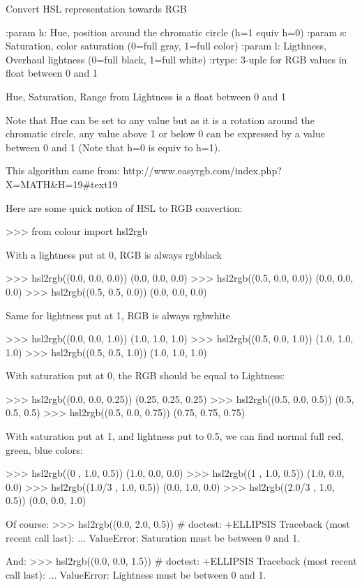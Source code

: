 \begin{DoxyVerb}Convert HSL representation towards RGB

:param h: Hue, position around the chromatic circle (h=1 equiv h=0)
:param s: Saturation, color saturation (0=full gray, 1=full color)
:param l: Ligthness, Overhaul lightness (0=full black, 1=full white)
:rtype: 3-uple for RGB values in float between 0 and 1

Hue, Saturation, Range from Lightness is a float between 0 and 1

Note that Hue can be set to any value but as it is a rotation
around the chromatic circle, any value above 1 or below 0 can
be expressed by a value between 0 and 1 (Note that h=0 is equiv
to h=1).

This algorithm came from:
http://www.easyrgb.com/index.php?X=MATH&H=19#text19

Here are some quick notion of HSL to RGB convertion:

>>> from colour import hsl2rgb

With a lightness put at 0, RGB is always rgbblack

>>> hsl2rgb((0.0, 0.0, 0.0))
(0.0, 0.0, 0.0)
>>> hsl2rgb((0.5, 0.0, 0.0))
(0.0, 0.0, 0.0)
>>> hsl2rgb((0.5, 0.5, 0.0))
(0.0, 0.0, 0.0)

Same for lightness put at 1, RGB is always rgbwhite

>>> hsl2rgb((0.0, 0.0, 1.0))
(1.0, 1.0, 1.0)
>>> hsl2rgb((0.5, 0.0, 1.0))
(1.0, 1.0, 1.0)
>>> hsl2rgb((0.5, 0.5, 1.0))
(1.0, 1.0, 1.0)

With saturation put at 0, the RGB should be equal to Lightness:

>>> hsl2rgb((0.0, 0.0, 0.25))
(0.25, 0.25, 0.25)
>>> hsl2rgb((0.5, 0.0, 0.5))
(0.5, 0.5, 0.5)
>>> hsl2rgb((0.5, 0.0, 0.75))
(0.75, 0.75, 0.75)

With saturation put at 1, and lightness put to 0.5, we can find
normal full red, green, blue colors:

>>> hsl2rgb((0 , 1.0, 0.5))
(1.0, 0.0, 0.0)
>>> hsl2rgb((1 , 1.0, 0.5))
(1.0, 0.0, 0.0)
>>> hsl2rgb((1.0/3 , 1.0, 0.5))
(0.0, 1.0, 0.0)
>>> hsl2rgb((2.0/3 , 1.0, 0.5))
(0.0, 0.0, 1.0)

Of course:
>>> hsl2rgb((0.0, 2.0, 0.5))  # doctest: +ELLIPSIS
Traceback (most recent call last):
...
ValueError: Saturation must be between 0 and 1.

And:
>>> hsl2rgb((0.0, 0.0, 1.5))  # doctest: +ELLIPSIS
Traceback (most recent call last):
...
ValueError: Lightness must be between 0 and 1.\end{DoxyVerb}
 \hypertarget{namespacecolour_aeb48782548179b2f488fbf820d49a8a3}{}
